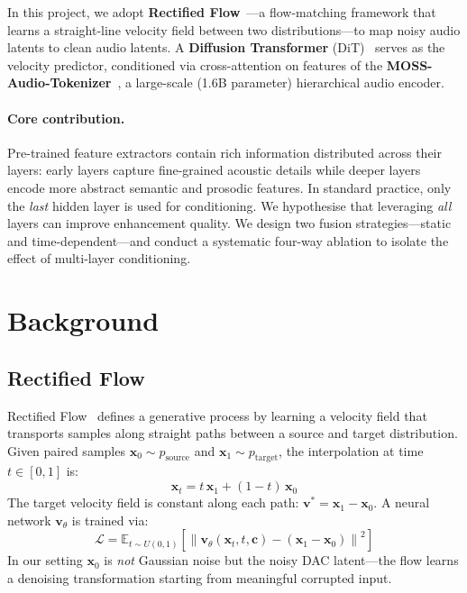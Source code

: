 \documentclass[10pt,twocolumn,letterpaper]{article}
\begin{document}
In this project, we adopt \textbf{Rectified Flow}~\cite{lipman2023flow}---a flow-matching framework that learns a straight-line velocity field between two distributions---to map noisy audio latents to clean audio latents.
A \textbf{Diffusion Transformer} (DiT)~\cite{peebles2023scalable} serves as the velocity predictor, conditioned via cross-attention on features of the \textbf{MOSS-Audio-Tokenizer}~\cite{gong2026moss}, a large-scale (1.6B parameter) hierarchical audio encoder.

\paragraph{Core contribution.}
Pre-trained feature extractors contain rich information distributed across their layers: early layers capture fine-grained acoustic details while deeper layers encode more abstract semantic and prosodic features.
In standard practice, only the \emph{last} hidden layer is used for conditioning.
We hypothesise that leveraging \emph{all} layers can improve enhancement quality.
We design two fusion strategies---static and time-dependent---and conduct a systematic four-way ablation to isolate the effect of multi-layer conditioning.

\section{Background}
\label{sec:background}

\subsection{Rectified Flow}

Rectified Flow~\cite{lipman2023flow,liu2023flow} defines a generative process by learning a velocity field that transports samples along straight paths between a source and target distribution.
Given paired samples $\mathbf{x}_0 \sim p_{\text{source}}$ and $\mathbf{x}_1 \sim p_{\text{target}}$, the interpolation at time $t \in [0,1]$ is:
\begin{equation}
  \mathbf{x}_t = t\,\mathbf{x}_1 + (1 - t)\,\mathbf{x}_0
  \label{eq:interpolation}
\end{equation}
The target velocity field is constant along each path: $\mathbf{v}^* = \mathbf{x}_1 - \mathbf{x}_0$.
A neural network $\mathbf{v}_\theta$ is trained via:
\begin{equation}
  \mathcal{L} = \mathbb{E}_{t \sim U(0,1)}\!\left[\left\|\mathbf{v}_\theta(\mathbf{x}_t, t, \mathbf{c}) - (\mathbf{x}_1 - \mathbf{x}_0)\right\|^2\right]
  \label{eq:loss}
\end{equation}
In our setting $\mathbf{x}_0$ is \emph{not} Gaussian noise but the noisy DAC latent---the flow learns a denoising transformation starting from meaningful corrupted input.
\end{document}
